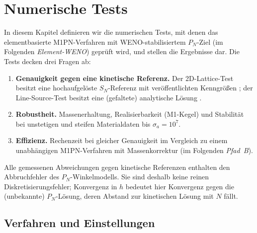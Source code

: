 \chapter{Numerische Tests}
\label{chap:tests}

In diesem Kapitel definieren wir die numerischen Tests, mit denen das elementbasierte
M1PN-Verfahren mit WENO-stabilisiertem $P_N$-Ziel (im Folgenden \emph{Element-WENO}) geprüft
wird, und stellen die Ergebnisse dar. Die Tests decken drei Fragen ab:
\begin{enumerate}
  \item \textbf{Genauigkeit gegen eine kinetische Referenz.} Der 2D-Lattice-Test besitzt eine
        hochaufgelöste $S_N$-Referenz mit veröffentlichten Kenngrößen \cite{schotthoefer_hauck_2025};
        der Line-Source-Test besitzt eine (gefaltete) analytische Lösung
        \cite{ganapol_2008,garrett_hauck_2013}.
  \item \textbf{Robustheit.} Massenerhaltung, Realisierbarkeit (M1-Kegel) und Stabilität bei
        unstetigen und steifen Materialdaten bis $\sigma_a=10^7$.
  \item \textbf{Effizienz.} Rechenzeit bei gleicher Genauigkeit im Vergleich zu einem unabhängigen
        M1PN-Verfahren mit Massenkorrektur (im Folgenden \emph{Pfad~B}).
\end{enumerate}
Alle gemessenen Abweichungen gegen kinetische Referenzen enthalten den Abbruchfehler des
$P_N$-Winkelmodells. Sie sind deshalb keine reinen Diskretisierungsfehler; Konvergenz in $h$
bedeutet hier Konvergenz gegen die (unbekannte) $P_N$-Lösung, deren Abstand zur kinetischen
Lösung mit $N$ fällt.

\section{Verfahren und Einstellungen}
\label{sec:tests:setup}

